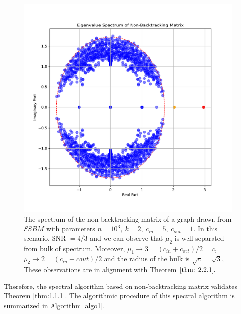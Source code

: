 \begin{figure}
    \centering
    \includegraphics[width=1\linewidth]{Figures/spectrum_plot.pdf}
    \caption[Spectrum distribution of non-backtracking matrix]{The spectrum of the non-backtracking matrix of a graph drawn from $SSBM$ with parameters $n=10^3,~k=2,~c_{in}=5,~c_{out}=1.$ In this scenario, SNR $=4/3$ and we can observe that $\mu_2$ is well-separated from bulk of spectrum. Moreover, $\mu_1\to3=(c_{in}+c_{out})/2=c$, $\mu_2\to2=(c_{in}-c{out})/2$ and the radius of the bulk is $\sqrt{c}=\sqrt{3},$ These observations are in alignment with Theorem $\ref{thm: 2.2.1}.$}
    \label{fig: spectrum}
\end{figure}

Therefore, the spectral algorithm based on non-backtracking matrix validates Theorem \ref{thm:1.1.1}. The algorithmic procedure of this spectral algorithm is summarized in Algorithm \ref{algo1}.

